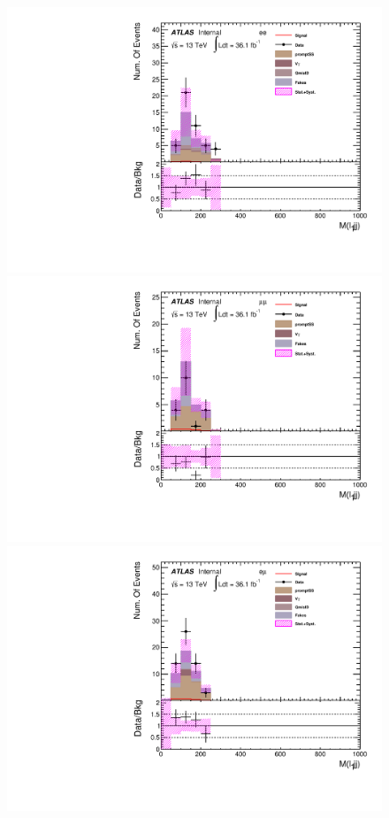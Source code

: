 \begin{figure}[h]
\begin{minipage}[t]{0.33\linewidth}
 \centering
 \includegraphics[width=1.0\textwidth,angle=-90]{fig/SigOpt/mH400_m_l1jj_ee.pdf}
 \end{minipage}
 \begin{minipage}[t]{0.33\linewidth}
 \centering
 \includegraphics[width=1.0\textwidth,angle=-90]{fig/SigOpt/mH400_m_l1jj_mumu.pdf}
 \end{minipage}
 \begin{minipage}[t]{0.33\linewidth}
 \centering
 \includegraphics[width=1.0\textwidth,angle=-90]{fig/SigOpt/mH400_m_l1jj_emu.pdf}

\end{minipage}
\end{figure}
